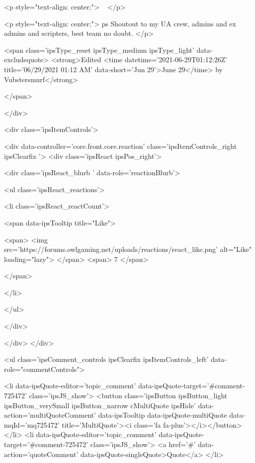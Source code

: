 <p style="text-align: center;">
	 
</p>

<p style="text-align: center;">
	ps Shoutout to my UA crew, admins and ex admins and scripters, best team no doubt.
</p>


			
				

<span class='ipsType_reset ipsType_medium ipsType_light' data-excludequote>
	<strong>Edited <time datetime='2021-06-29T01:12:26Z' title='06/29/2021 01:12  AM' data-short='Jun 29'>June 29</time> by Vubstersmurf</strong>
	
	
</span>
			
		</div>

		
			<div class='ipsItemControls'>
				
					
						

	<div data-controller='core.front.core.reaction' class='ipsItemControls_right ipsClearfix '>	
		<div class='ipsReact ipsPos_right'>
			
				
				<div class='ipsReact_blurb ' data-role='reactionBlurb'>
					
						

	
	<ul class='ipsReact_reactions'>
		
		
			
				
				<li class='ipsReact_reactCount'>
					
						<span data-ipsTooltip title="Like">
					
							<span>
								<img src='https://forums.owlgaming.net/uploads/reactions/react_like.png' alt="Like" loading="lazy">
							</span>
							<span>
								7
							</span>
					
						</span>
					
				</li>
			
		
	</ul>

					
				</div>
			
			
			
		</div>
	</div>

					
				
				<ul class='ipsComment_controls ipsClearfix ipsItemControls_left' data-role="commentControls">
					
						
							<li data-ipsQuote-editor='topic_comment' data-ipsQuote-target='#comment-725472' class='ipsJS_show'>
								<button class='ipsButton ipsButton_light ipsButton_verySmall ipsButton_narrow cMultiQuote ipsHide' data-action='multiQuoteComment' data-ipsTooltip data-ipsQuote-multiQuote data-mqId='mq725472' title='MultiQuote'><i class='fa fa-plus'></i></button>
							</li>
							<li data-ipsQuote-editor='topic_comment' data-ipsQuote-target='#comment-725472' class='ipsJS_show'>
								<a href='#' data-action='quoteComment' data-ipsQuote-singleQuote>Quote</a>
							</li>
						
